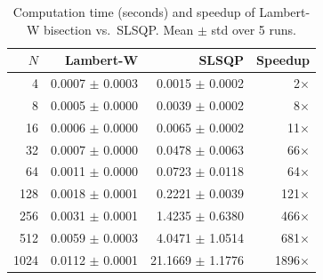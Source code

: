 \begin{table}[t]
\centering
\caption{Computation time (seconds) and speedup of Lambert-W bisection vs.\ SLSQP. Mean $\pm$ std over 5 runs.}
\label{tab:computation}
\begin{tabular}{rrrr}
\toprule
$N$ & Lambert-W & SLSQP & Speedup \\
\midrule
4 & 0.0007 $\pm$ 0.0003 & 0.0015 $\pm$ 0.0002 & 2$\times$ \\
8 & 0.0005 $\pm$ 0.0000 & 0.0039 $\pm$ 0.0002 & 8$\times$ \\
16 & 0.0006 $\pm$ 0.0000 & 0.0065 $\pm$ 0.0002 & 11$\times$ \\
32 & 0.0007 $\pm$ 0.0000 & 0.0478 $\pm$ 0.0063 & 66$\times$ \\
64 & 0.0011 $\pm$ 0.0000 & 0.0723 $\pm$ 0.0118 & 64$\times$ \\
128 & 0.0018 $\pm$ 0.0001 & 0.2221 $\pm$ 0.0039 & 121$\times$ \\
256 & 0.0031 $\pm$ 0.0001 & 1.4235 $\pm$ 0.6380 & 466$\times$ \\
512 & 0.0059 $\pm$ 0.0003 & 4.0471 $\pm$ 1.0514 & 681$\times$ \\
1024 & 0.0112 $\pm$ 0.0001 & 21.1669 $\pm$ 1.1776 & 1896$\times$ \\
\bottomrule
\end{tabular}
\end{table}
